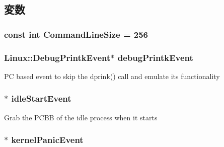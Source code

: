 \subsection{変数}
\hypertarget{classLinuxAlphaSystem_a40cf7cde1351c066dee545df2832e4c7}{
\subsubsection[{CommandLineSize}]{\setlength{\rightskip}{0pt plus 5cm}const int {\bf CommandLineSize} = 256}}
\label{classLinuxAlphaSystem_a40cf7cde1351c066dee545df2832e4c7}
\hypertarget{classLinuxAlphaSystem_aedceac66468548dd7c74a37cb968a83b}{
\subsubsection[{debugPrintkEvent}]{\setlength{\rightskip}{0pt plus 5cm}Linux::DebugPrintkEvent$\ast$ {\bf debugPrintkEvent}}}
\label{classLinuxAlphaSystem_aedceac66468548dd7c74a37cb968a83b}
PC based event to skip the dprink() call and emulate its functionality \hypertarget{classLinuxAlphaSystem_a063da82d4b5c3e8ea09eeb1d65d0666e}{
\subsubsection[{idleStartEvent}]{$\ast$ {\bf idleStartEvent}}}
\label{classLinuxAlphaSystem_a063da82d4b5c3e8ea09eeb1d65d0666e}
Grab the PCBB of the idle process when it starts \hypertarget{classLinuxAlphaSystem_aa052aa785f60b08b9c27dfe6838686e4}{
\subsubsection[{kernelPanicEvent}]{$\ast$ {\bf kernelPanicEvent}}}
